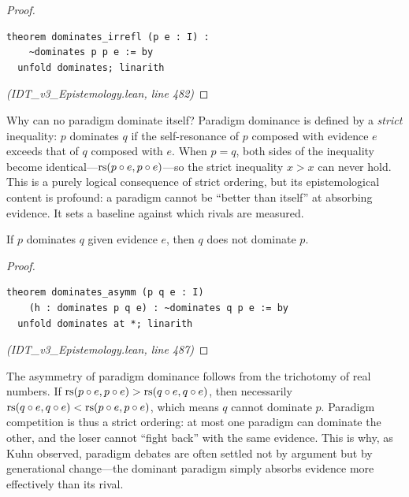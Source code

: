 \begin{proof}
\begin{lstlisting}
theorem dominates_irrefl (p e : I) :
    ~dominates p p e := by
  unfold dominates; linarith
\end{lstlisting}
\textit{(IDT\_v3\_Epistemology.lean, line 482)}
\end{proof}

\begin{remark}
Why can no paradigm dominate itself? Paradigm dominance is defined by a \emph{strict}
inequality: $p$ dominates $q$ if the self-resonance of $p$ composed with evidence $e$
exceeds that of $q$ composed with $e$. When $p = q$, both sides of the inequality
become identical---$\mathrm{rs}(p \circ e, p \circ e)$---so the strict inequality
$x > x$ can never hold. This is a purely logical consequence of strict ordering,
but its epistemological content is profound: a paradigm cannot be ``better than
itself'' at absorbing evidence. It sets a baseline against which rivals are measured.
\end{remark}


\begin{theorem}
\label{thm:paradigm-asymm}
If $p$ dominates $q$ given evidence $e$, then $q$ does not dominate $p$.
\end{theorem}

\begin{proof}
\begin{lstlisting}
theorem dominates_asymm (p q e : I)
    (h : dominates p q e) : ~dominates q p e := by
  unfold dominates at *; linarith
\end{lstlisting}
\textit{(IDT\_v3\_Epistemology.lean, line 487)}
\end{proof}

\begin{remark}
The asymmetry of paradigm dominance follows from the trichotomy of real numbers.
If $\mathrm{rs}(p \circ e, p \circ e) > \mathrm{rs}(q \circ e, q \circ e)$, then
necessarily $\mathrm{rs}(q \circ e, q \circ e) < \mathrm{rs}(p \circ e, p \circ e)$,
which means $q$ cannot dominate $p$. Paradigm competition is thus a strict
ordering: at most one paradigm can dominate the other, and the loser cannot
``fight back'' with the same evidence. This is why, as Kuhn observed, paradigm
debates are often settled not by argument but by generational change---the dominant
paradigm simply absorbs evidence more effectively than its rival.
\end{remark}

